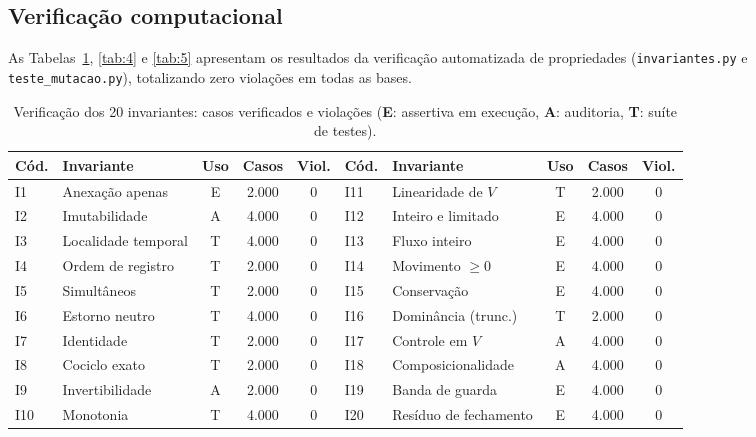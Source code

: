 \documentclass[11pt, a4paper]{article}
\theoremstyle{definition}
\theoremstyle{plain}
\theoremstyle{remark}
\begin{document}
\subsection{Verificação computacional}\label{sec:6.4}

As Tabelas~\ref{tab:3}, \ref{tab:4} e \ref{tab:5} apresentam os resultados da verificação automatizada de propriedades (\texttt{invariantes.py} e \texttt{teste\_mutacao.py}), totalizando zero violações em todas as bases.

\begin{table}[htbp]
\centering
\small
\begin{tabular}{@{}llccc@{\hspace{2em}}llccc@{}}
\toprule
\textbf{Cód.} & \textbf{Invariante} & \textbf{Uso} & \textbf{Casos} & \textbf{Viol.} & \textbf{Cód.} & \textbf{Invariante} & \textbf{Uso} & \textbf{Casos} & \textbf{Viol.} \\
\midrule
I1  & Anexação apenas     & E & 2.000 & 0 & I11 & Linearidade de $V$    & T & 2.000 & 0 \\
I2  & Imutabilidade       & A & 4.000 & 0 & I12 & Inteiro e limitado    & E & 4.000 & 0 \\
I3  & Localidade temporal & T & 4.000 & 0 & I13 & Fluxo inteiro         & E & 4.000 & 0 \\
I4  & Ordem de registro   & T & 2.000 & 0 & I14 & Movimento $\ge 0$     & E & 4.000 & 0 \\
I5  & Simultâneos         & T & 2.000 & 0 & I15 & Conservação           & E & 4.000 & 0 \\
I6  & Estorno neutro      & T & 4.000 & 0 & I16 & Dominância (trunc.)   & T & 2.000 & 0 \\
I7  & Identidade          & T & 2.000 & 0 & I17 & Controle em $V$       & A & 4.000 & 0 \\
I8  & Cociclo exato       & T & 2.000 & 0 & I18 & Composicionalidade    & A & 4.000 & 0 \\
I9  & Invertibilidade     & A & 2.000 & 0 & I19 & Banda de guarda       & E & 4.000 & 0 \\
I10 & Monotonia           & T & 4.000 & 0 & I20 & Resíduo de fechamento & E & 4.000 & 0 \\
\bottomrule
\end{tabular}
\caption{Verificação dos 20 invariantes: casos verificados e violações (\textbf{E}: assertiva em execução, \textbf{A}: auditoria, \textbf{T}: suíte de testes).}
\label{tab:3}
\end{table}
\end{document}
